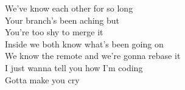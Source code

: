 We've know each other for so long \\
Your branch's been aching but \\
You're too shy to merge it \\
Inside we both know what's been going on \\
We know the remote and we're gonna rebase it \\
I just wanna tell you how I'm coding \\
Gotta make you cry \\


\vspace*{3cm}

\begin{center}
\end{center}

\pagebreak
